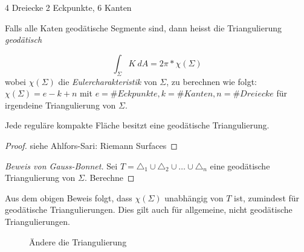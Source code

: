 \documentclass[../main.tex]{subfiles}
\begin{document}
\begin{example}
    4 Dreiecke
    2 Eckpunkte, 6 Kanten
\end{example}
Falls alle Katen geodätische Segmente sind, dann heisst die Triangulierung \emph{geodätisch}

\begin{theorem}
    $$\int_{\Sigma}K \ dA = 2 \pi * \chi (\Sigma)$$ wobei $\chi (\Sigma)$ die \emph{Eulercharakteristik} von $\Sigma$, zu berechnen wie folgt:
    $\chi (\Sigma) = e - k + n$ mit $e= \#Eckpunkte, k=\#Kanten, n=\#Dreiecke$ für irgendeine Triangulierung von $\Sigma$.
\end{theorem}

\begin{theorem}
    Jede reguläre kompakte Fläche besitzt eine geodätische Triangulierung.
\end{theorem}
\begin{proof}
    siehe Ahlfors-Sari: Riemann Surfaces
\end{proof}

\begin{proof}[Beweis von Gauss-Bonnet]
    Sei $T= \triangle_1 \cup \triangle_2 \cup \dots \cup \triangle_n$ eine geodätische Triangulierung von $\Sigma$.
    Berechne
\end{proof}

\begin{remark}
    Aus dem obigen Beweis folgt, dass $\chi (\Sigma)$ unabhängig von $T$ ist, zumindest für geodätische Triangulierungen.
    Dies gilt auch für allgemeine, nicht geodätische Triangulierungen.
    \begin{figure}[htb]
        \centering
        \def\svgwidth{20em}
        
        \caption{Ändere die Triangulierung}        
    \end{figure}
\end{remark}
\end{document}
